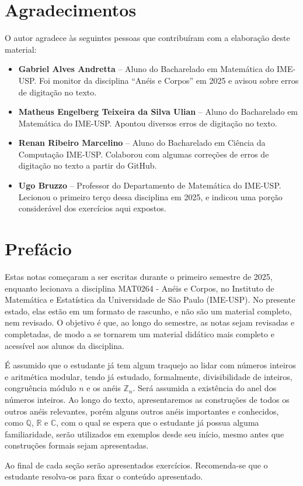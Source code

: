 \chapter{Agradecimentos}

O autor agradece às seguintes pessoas que contribuíram com a elaboração deste material:
\begin{itemize}
\item \textbf{Gabriel Alves Andretta} -- Aluno do Bacharelado em Matemática do IME-USP. Foi monitor da disciplina ``Anéis e Corpos'' em 2025 e avisou sobre erros de digitação no texto.
\item \textbf{Matheus Engelberg Teixeira da Silva Ulian} -- Aluno do Bacharelado em Matemática do IME-USP. Apontou diversos erros de digitação no texto.
\item \textbf{Renan Ribeiro Marcelino} -- Aluno do Bacharelado em Ciência da Computação IME-USP. Colaborou com algumas correções de erros de digitação no texto a partir do GitHub.
\item \textbf{Ugo Bruzzo} -- Professor do Departamento de Matemática do IME-USP. Lecionou o primeiro terço dessa disciplina em 2025, e indicou uma porção considerável dos exercícios aqui expostos.
\end{itemize}

\chapter{Prefácio}

Estas notas começaram a ser escritas durante o primeiro semestre de 2025, enquanto lecionava a disciplina MAT0264 - Anéis e Corpos, no Instituto de Matemática e Estatística da Universidade de São Paulo (IME-USP).
No presente estado, elas estão em um formato de rascunho, e não são um material completo, nem revisado. O objetivo é que, ao longo do semestre, as notas sejam revisadas e completadas, de modo a se tornarem um material didático mais completo e acessível aos alunos da disciplina.

É assumido que o estudante já tem algum traquejo ao lidar com números inteiros e aritmética modular, tendo já estudado, formalmente, divisibilidade de inteiros, congruência módulo $n$ e os anéis $\mathbb Z_n$.
Será assumida a existência do anel dos números inteiros.
Ao longo do texto, apresentaremos as construções de todos os outros anéis relevantes, porém alguns outros anéis importantes e conhecidos, como $\mathbb Q$, $\mathbb R$ e $\mathbb C$, com o qual se espera que o estudante já possua alguma familiaridade, serão utilizados em exemplos desde seu início, mesmo antes que construções formais sejam apresentadas.

Ao final de cada seção serão apresentados exercícios. Recomenda-se que o estudante resolva-os para fixar o conteúdo apresentado.